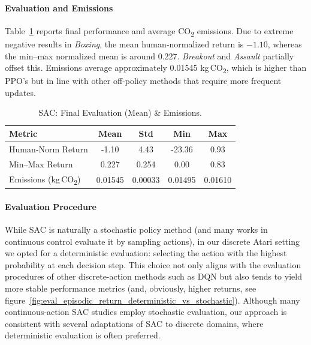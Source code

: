\paragraph{Evaluation and Emissions}
Table~\ref{tab:sac_eval} reports final performance and average CO\textsubscript{2} emissions. Due to extreme negative results in \emph{Boxing}, the mean human‐normalized return is \(-1.10\), whereas the min–max normalized mean is around 0.227. \emph{Breakout} and \emph{Assault} partially offset this. Emissions average approximately 0.01545 kg\,CO\textsubscript{2}, which is higher than PPO's but in line with other off-policy methods that require more frequent updates.

\begin{table}
	\centering
	\caption{SAC: Final Evaluation (Mean) \& Emissions.}
	\label{tab:sac_eval}
	\begin{tabular}{lcccc}
		\toprule
		\textbf{Metric} & \textbf{Mean} & \textbf{Std} & \textbf{Min} & \textbf{Max} \\
		\midrule
		Human‐Norm Return & -1.10 & 4.43 & -23.36 & 0.93 \\
		Min–Max Return   & 0.227 & 0.254 & 0.00   & 0.83 \\
		Emissions (kg\,CO\textsubscript{2}) & 0.01545 & 0.00033 & 0.01495 & 0.01610 \\
		\bottomrule
	\end{tabular}
\end{table}

\paragraph{Evaluation Procedure}
While SAC is naturally a stochastic policy method (and many works in continuous control evaluate it by sampling actions), in our discrete Atari setting we opted for a deterministic evaluation: selecting the action with the highest probability at each decision step. This choice not only aligns with the evaluation procedures of other discrete-action methods such as DQN but also tends to yield more stable performance metrics (and, obviously, higher returns, see figure~\vref{fig:eval_episodic_return_deterministic_vs_stochastic}). Although many continuous-action SAC studies employ stochastic evaluation, our approach is consistent with several adaptations of SAC to discrete domains, where deterministic evaluation is often preferred.

